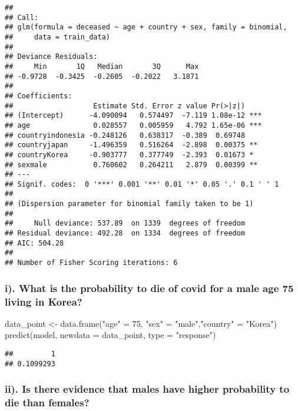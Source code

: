 \documentclass[
]{article}
\newenvironment{Shaded}{\begin{snugshade}}{\end{snugshade}}
\newcommand{\AttributeTok}[1]{\textcolor[rgb]{0.77,0.63,0.00}{#1}}
\newcommand{\DecValTok}[1]{\textcolor[rgb]{0.00,0.00,0.81}{#1}}
\newcommand{\FunctionTok}[1]{\textcolor[rgb]{0.00,0.00,0.00}{#1}}
\newcommand{\NormalTok}[1]{#1}
\newcommand{\OtherTok}[1]{\textcolor[rgb]{0.56,0.35,0.01}{#1}}
\newcommand{\StringTok}[1]{\textcolor[rgb]{0.31,0.60,0.02}{#1}}
\begin{document}
\begin{verbatim}
## 
## Call:
## glm(formula = deceased ~ age + country + sex, family = binomial, 
##     data = train_data)
## 
## Deviance Residuals: 
##     Min       1Q   Median       3Q      Max  
## -0.9728  -0.3425  -0.2605  -0.2022   3.1871  
## 
## Coefficients:
##                   Estimate Std. Error z value Pr(>|z|)    
## (Intercept)      -4.090094   0.574497  -7.119 1.08e-12 ***
## age               0.028557   0.005959   4.792 1.65e-06 ***
## countryindonesia -0.248126   0.638317  -0.389  0.69748    
## countryjapan     -1.496359   0.516264  -2.898  0.00375 ** 
## countryKorea     -0.903777   0.377749  -2.393  0.01673 *  
## sexmale           0.760602   0.264211   2.879  0.00399 ** 
## ---
## Signif. codes:  0 '***' 0.001 '**' 0.01 '*' 0.05 '.' 0.1 ' ' 1
## 
## (Dispersion parameter for binomial family taken to be 1)
## 
##     Null deviance: 537.89  on 1339  degrees of freedom
## Residual deviance: 492.28  on 1334  degrees of freedom
## AIC: 504.28
## 
## Number of Fisher Scoring iterations: 6
\end{verbatim}

\hypertarget{i.-what-is-the-probability-to-die-of-covid-for-a-male-age-75-living-in-korea}{%
\subsubsection{i). What is the probability to die of covid for a male
age 75 living in
Korea?}\label{i.-what-is-the-probability-to-die-of-covid-for-a-male-age-75-living-in-korea}}

\begin{Shaded}
\begin{Highlighting}[]
\NormalTok{data\_point }\OtherTok{\textless{}{-}} \FunctionTok{data.frame}\NormalTok{(}\StringTok{"age"} \OtherTok{=} \DecValTok{75}\NormalTok{, }\StringTok{"sex"} \OtherTok{=} \StringTok{"male"}\NormalTok{,}\StringTok{"country"} \OtherTok{=} \StringTok{"Korea"}\NormalTok{)}
\FunctionTok{predict}\NormalTok{(model, }\AttributeTok{newdata =}\NormalTok{ data\_point, }\AttributeTok{type =} \StringTok{"response"}\NormalTok{)}
\end{Highlighting}
\end{Shaded}

\begin{verbatim}
##         1 
## 0.1099293
\end{verbatim}

\hypertarget{ii.-is-there-evidence-that-males-have-higher-probability-to-die-than-females}{%
\subsubsection{ii). Is there evidence that males have higher probability
to die than
females?}\label{ii.-is-there-evidence-that-males-have-higher-probability-to-die-than-females}}
\end{document}
